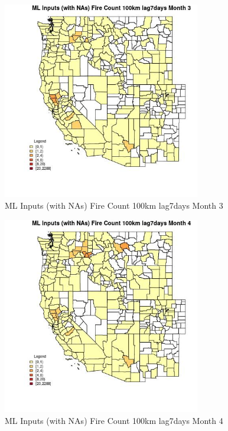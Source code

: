 \begin{figure} 
\centering  
\includegraphics[width=0.77\textwidth]{Code_Outputs/Report_ML_input_PM25_Step4_part_e_de_duplicated_aves_compiled_2019-05-20wNAs_CountyFire_Count_100km_lag7daysmedianMonth3.jpg} 
\caption{\label{fig:Report_ML_input_PM25_Step4_part_e_de_duplicated_aves_compiled_2019-05-20wNAsCountyFire_Count_100km_lag7daysmedianMonth3}ML Inputs (with NAs) Fire Count 100km lag7days Month 3} 
\end{figure} 
 

\begin{figure} 
\centering  
\includegraphics[width=0.77\textwidth]{Code_Outputs/Report_ML_input_PM25_Step4_part_e_de_duplicated_aves_compiled_2019-05-20wNAs_CountyFire_Count_100km_lag7daysmedianMonth4.jpg} 
\caption{\label{fig:Report_ML_input_PM25_Step4_part_e_de_duplicated_aves_compiled_2019-05-20wNAsCountyFire_Count_100km_lag7daysmedianMonth4}ML Inputs (with NAs) Fire Count 100km lag7days Month 4} 
\end{figure} 
 

